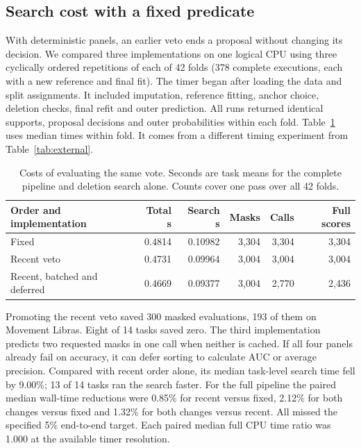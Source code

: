 \subsection{Search cost with a fixed predicate}
With deterministic panels, an earlier veto ends a proposal without changing its decision. We compared three implementations on one logical CPU using three cyclically ordered repetitions of each of 42 folds (378 complete executions, each with a new reference and final fit). The timer began after loading the data and split assignments. It included imputation, reference fitting, anchor choice, deletion checks, final refit and outer prediction. All runs returned identical supports, proposal decisions and outer probabilities within each fold. Table~\ref{tab:timing} uses median times within fold. It comes from a different timing experiment from Table~\ref{tab:external}.

\begin{table}[tb]
\centering
\caption{Costs of evaluating the same vote. Seconds are task means for the complete pipeline and deletion search alone. Counts cover one pass over all 42 folds.}
\label{tab:timing}
\small
\begin{tabular}{lrrrrr}
\toprule
Order and implementation & Total s & Search s & Masks & Calls & Full scores\\
\midrule
Fixed & 0.4814 & 0.10982 & 3,304 & 3,304 & 3,304\\
Recent veto & 0.4731 & 0.09964 & 3,004 & 3,004 & 3,004\\
Recent, batched and deferred & 0.4669 & 0.09377 & 3,004 & 2,770 & 2,436\\
\bottomrule
\end{tabular}
\end{table}

Promoting the recent veto saved 300 masked evaluations, 193 of them on Movement Libras. Eight of 14 tasks saved zero. The third implementation predicts two requested masks in one call when neither is cached. If all four panels already fail on accuracy, it can defer sorting to calculate AUC or average precision. Compared with recent order alone, its median task-level search time fell by 9.00\%; 13 of 14 tasks ran the search faster. For the full pipeline the paired median wall-time reductions were 0.85\% for recent versus fixed, 2.12\% for both changes versus fixed and 1.32\% for both changes versus recent. All missed the specified 5\% end-to-end target. Each paired median full CPU time ratio was 1.000 at the available timer resolution.

